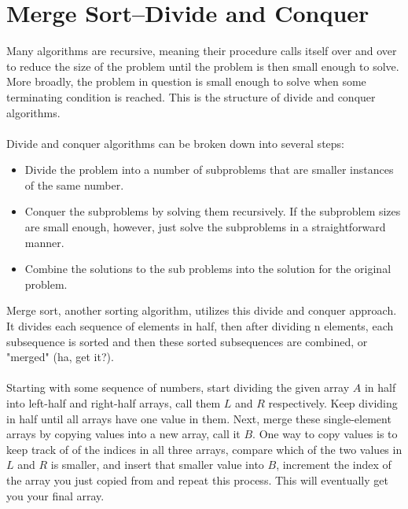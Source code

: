 \documentclass{article}
\begin{document}
\section*{Merge Sort--Divide and Conquer}
Many algorithms are recursive, meaning their procedure calls itself over and over to reduce the size of the problem until the problem is then small enough to solve. More broadly, the problem in question is small enough to solve when some terminating condition is reached. This is the structure of divide and conquer algorithms.
\\
\\
Divide and conquer algorithms can be broken down into several steps:
\begin{itemize}
  \item Divide the problem into a number of subproblems that are smaller instances of the same number.
  \item Conquer the subproblems by solving them recursively. If the subproblem sizes are small enough, however, just solve the subproblems in a straightforward manner.
  \item Combine the solutions to the sub problems into the solution for the original problem.
\end{itemize}
Merge sort, another sorting algorithm, utilizes this divide and conquer approach. It divides each sequence of elements in half, then after dividing n elements, each subsequence is sorted and then these sorted subsequences are combined, or "merged" (ha, get it?).
\\
\\
Starting with some sequence of numbers, start dividing the given array $A$ in half into left-half and right-half arrays, call them $L$ and $R$ respectively. Keep dividing in half until all arrays have one value in them. Next, merge these single-element arrays by copying values into a new array, call it $B$. One way to copy values is to keep track of of the indices in all three arrays, compare which of the two values in $L$ and $R$ is smaller, and insert that smaller value into $B$, increment the index of the array you just copied from and repeat this process. This will eventually get you your final array.
\end{document}
